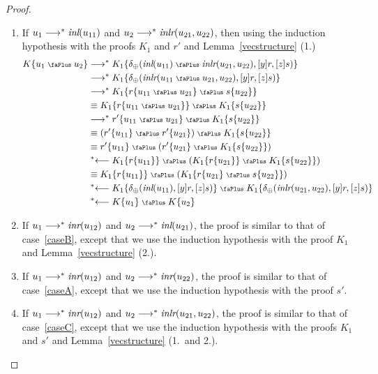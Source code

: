 \documentclass[screen, sigconf,authorversion,nonacm]{acmart}
\theoremstyle{acmdefinition}
\numberwithin{equation}{section}
\newcommand\abstr[1]{[#1]}
\newcommand\inl{\mbox{\it inl}}
\newcommand\inr{\mbox{\it inr}}
\newcommand\inlr{\mbox{\it inlr}}
\newcommand\plus{\mathrel{\text{\normalfont\scalebox{0.7}{\faPlus}}}}
\newcommand\lra{\longrightarrow}
\newcommand\lras{\lra^*}
\newcommand\llas{\mathrel{{}^*{\longleftarrow}}}
\newcommand\elimplus{\delta_{\oplus}}
\begin{document}
\begin{proof}
\begin{itemize}
\begin{itemize}
\begin{enumerate}
         
       \item\label{caseC} If $u_1 \lras \inl(u_{11})$ and $u_2 \lras
         \inlr(u_{21},u_{22})$, then using the induction hypothesis
         with the proofs $K_1$ and $r'$ and
         Lemma~\ref{vecstructure} (1.)
\begin{align*}
     K\{u_1 \plus u_2\}
     &\lras K_1\{\elimplus(\inl(u_{11}) \plus \inlr(u_{21},u_{22}),
        \abstr{y}r, \abstr{z}s)\}\\
     &\lras K_1 \{\elimplus(\inlr(u_{11} \plus u_{21},u_{22}),
        \abstr{y}r, \abstr{z}s)\}\\
     &\lras K_1 \{r\{u_{11} \plus u_{21}\} \plus s\{u_{22}\}\}\\
        &\equiv K_1 \{r\{u_{11} \plus u_{21}\}\} \plus K_1\{s\{u_{22}\}\}\\
     &\lras r'\{u_{11} \plus u_{21}\} \plus K_1\{s\{u_{22}\}\}\\
     &\equiv (r'\{u_{11}\} \plus r'\{u_{21}\}) \plus K_1\{s\{u_{22}\}\}\\
     &\equiv r'\{u_{11}\} \plus (r'\{u_{21}\} \plus K_1\{s\{u_{22}\}\})\\
     &\llas K_1\{r\{u_{11}\}\} \plus
        (K_1 \{r\{u_{21}\}\} \plus K_1\{s\{u_{22}\}\})\\
     &\equiv K_1\{r\{u_{11}\}\} \plus
        (K_1\{r\{u_{21}\} \plus s\{u_{22}\}\})\\
     &\llas K_1 \{\elimplus(\inl(u_{11}),\abstr{y}r,\abstr{z}s)\}
            \plus K_1 \{\elimplus(\inlr(u_{21},u_{22}),\abstr{y}r,\abstr{z}s)\}\\
     &\llas K\{u_1\} \plus K\{u_2\}
\end{align*}

         
       \item If $u_1 \lras \inr(u_{12})$ and $u_2 \lras \inl(u_{21})$,
         the proof is similar to that of case~\eqref{caseB}, except that we use
         the induction hypothesis with the proof $K_1$ and 
         Lemma~\ref{vecstructure} (2.).

       \item If $u_1 \lras \inr(u_{12})$ and $u_2 \lras \inr(u_{22})$,
         the proof is similar to that of case~\eqref{caseA}, except that we use the
         induction hypothesis with the proof
         $s'$.
         
       \item If $u_1 \lras \inr(u_{12})$ and $u_2 \lras
         \inlr(u_{21},u_{22})$, the proof is similar to that of case~\eqref{caseC}, except that we use
         the induction hypothesis with the proofs $K_1$ and $s'$ and
         Lemma~\ref{vecstructure} (1.~and 2.).


\end{enumerate}
\end{itemize}
\end{itemize}
\end{proof}
\end{document}
